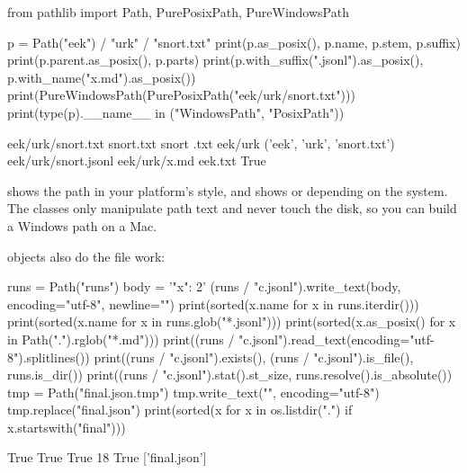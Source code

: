 \begin{pycode}
from pathlib import Path, PurePosixPath, PureWindowsPath

p = Path("eek") / "urk" / "snort.txt"
print(p.as_posix(), p.name, p.stem, p.suffix)
print(p.parent.as_posix(), p.parts)
print(p.with_suffix(".jsonl").as_posix(), p.with_name("x.md").as_posix())
print(PureWindowsPath(PurePosixPath("eek/urk/snort.txt")))
print(type(p).__name__ in ("WindowsPath", "PosixPath"))
\end{pycode}
\begin{rawcode}
eek/urk/snort.txt snort.txt snort .txt
eek/urk ('eek', 'urk', 'snort.txt')
eek/urk/snort.jsonl eek/urk/x.md
eek\urk\snort.txt
True
\end{rawcode}

 shows the path in your platform's style, and  shows
 or  depending on the system. The 
classes only manipulate path text and never touch the disk, so you can build a Windows path on a
Mac.

 objects also do the file work:

\begin{pycode}
runs = Path("runs")
body = '{"x": 2}\n'
(runs / "c.jsonl").write_text(body, encoding="utf-8", newline="\n")
print(sorted(x.name for x in runs.iterdir()))
print(sorted(x.name for x in runs.glob("*.jsonl")))
print(sorted(x.as_posix() for x in Path(".").rglob("*.md")))
print((runs / "c.jsonl").read_text(encoding="utf-8").splitlines())
print((runs / "c.jsonl").exists(), (runs / "c.jsonl").is_file(), runs.is_dir())
print((runs / "c.jsonl").stat().st_size, runs.resolve().is_absolute())
tmp = Path("final.json.tmp")
tmp.write_text("{}", encoding="utf-8")
tmp.replace("final.json")
print(sorted(x for x in os.listdir(".") if x.startswith("final")))
\end{pycode}
\begin{rawcode}
True True True
18 True
['final.json']
\end{rawcode}

